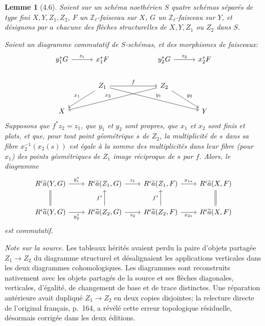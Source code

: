 \documentclass[10pt]{article}
\newcommand{\Z}{\mathbb Z}
\newtheorem*{lemma}{Lemme}
\begin{document}
\begin{lemma}[4.6]
Soient sur un schéma noethérien $S$ quatre schémas séparés de type fini $X,Y,Z_1,Z_2$, $F$ un $\Z_\ell$-faisceau sur $X$, $G$ un $\Z_\ell$-faisceau sur $Y$, et désignons par $a$ chacune des flèches structurelles de $X,Y,Z_1$ ou $Z_2$ dans $S$.

Soient un diagramme commutatif de $S$-schémas, et des morphismes de faisceaux:
\begin{equation*}
\begin{tikzcd}[column sep=3.0em,row sep=2.0em]
y_1^*G \arrow[r,"z_1"] & x_1^*F && y_2^*G \arrow[r,"z_2"] & x_2^*F \\
& Z_1 \arrow[rr,"f"] \arrow[dl,"x_1"'] \arrow[drrr,"y_1"] &&
Z_2 \arrow[dlll,"x_2"'] \arrow[dr,"y_2"] & \\
X &&&& Y
\end{tikzcd}
\end{equation*}
Supposons que $f^*z_2=z_1$, que $y_1$ et $y_2$ sont propres, que $x_1$ et $x_2$ sont finis et plats, et que, pour tout point géométrique $s$ de $Z_2$, la multiplicité de $s$ dans sa fibre $x_2^{-1}(x_2(s))$ est égale à la somme des multiplicités dans leur fibre (pour $x_1$) des points géométriques de $Z_1$ image réciproque de $s$ par $f$. Alors, le diagramme
\begin{equation*}
\begin{tikzcd}[column sep=2.2em,row sep=2.2em]
R^i\widetilde a(Y,G) \arrow[r,"y_1^*"] & R^i\widetilde a(Z_1,G) \arrow[r,"z_1"] &
R^i\widetilde a(Z_1,F) \arrow[r,"x_{1*}"] & R^i\widetilde a(X,F) \\
R^i\widetilde a(Y,G) \arrow[r,"y_2^*"'] \arrow[u,equal] &
R^i\widetilde a(Z_2,G) \arrow[r,"z_2"'] \arrow[u,"f^*"] &
R^i\widetilde a(Z_2,F) \arrow[r,"x_{2*}"'] \arrow[u,"f^*"] &
R^i\widetilde a(X,F) \arrow[u,equal]
\end{tikzcd}
\end{equation*}
est commutatif.
\end{lemma}

\noindent\emph{Note sur la source.} Les tableaux hérités avaient perdu la paire d'objets partagée $Z_1\to Z_2$ du diagramme structurel et désalignaient les applications verticales dans les deux diagrammes cohomologiques. Les diagrammes sont reconstruits nativement avec les objets partagés de la source et ses flèches diagonales, verticales, d'égalité, de changement de base et de trace distinctes. Une réparation antérieure avait dupliqué $Z_1\to Z_2$ en deux copies disjointes; la relecture directe de l'original français, p.~164, a révélé cette erreur topologique résiduelle, désormais corrigée dans les deux éditions.
\end{document}
